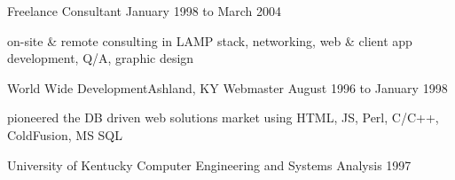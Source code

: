 \documentclass[10pt]{article}
\begin{document}
\sectionheader
{Freelance}{}
{Consultant}
{January 1998 to March 2004}
\begin{longtext}
on-site \& remote consulting in LAMP stack, networking, web \& client app development, Q/A, graphic design
\end{longtext}

\sectionheader
{World Wide Development}{Ashland, KY}
{Webmaster}
{August 1996 to January 1998}
\begin{longtext}
pioneered the DB driven web solutions market using HTML, JS, Perl, C/C++, ColdFusion, MS SQL
\end{longtext}


\sectionheader
{University of Kentucky}
{}
{Computer Engineering and Systems Analysis}
{1997}
\fix
\end{document}
